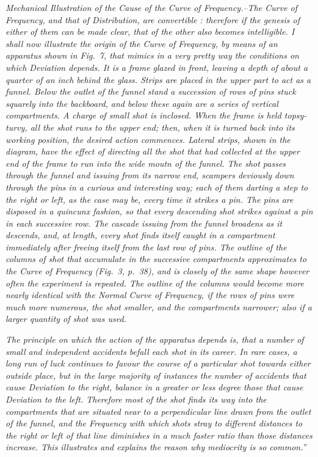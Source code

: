 {\it {\em Mechanical Illustration of the Cause of the Curve of Frequency}.--The Curve of Frequency, and that of Distribution, are convertible : therefore if the genesis of either of them can be made clear, that of the other also becomes intelligible.  I shall now illustrate the origin of the Curve of Frequency, by means of an apparatus shown in Fig.~7, that mimics in a very pretty way the conditions
on which Deviation depends.  It is a frame glazed in front, leaving a depth of about a quarter of an inch behind the glass.  Strips are placed in the upper part to act as a funnel.  Below the outlet of the funnel stand a succession of rows of pins stuck squarely into the backboard, and below these again are a series of vertical compartments.  A charge of small shot is inclosed.  When the frame is held topsy-turvy, all the shot runs to the upper end; then, when it is turned back into its working position, the desired action commences.  Lateral strips, shown in the diagram, have the effect of directing all the shot that had collected at the upper end of the frame to run into the wide moutn of the funnel.  The shot passes through the funnel and issuing from its narrow end, scampers deviously down through the pins in a curious and interesting way; each of them darting a step to the right or left, as the case may be, every time it strikes a pin.  The pins are disposed in a quincunx fashion, so that every descending shot strikes against a pin in each successive row.  The cascade issuing from the funnel broadens as it descends, and, at length, every shot finds itself caught in a compartment immediately after freeing itself from the last row of pins.  The outline of the columns of shot that accumulate in the successive compartments approximates to the Curve of Frequency (Fig.~3, p.~38), and is closely of the same shape however often the experiment is repeated.  The outline of the columns would become more nearly identical with the Normal Curve of Frequency, if the rows of pins were much more numerous, the shot smaller, and the compartments narrower; also if a larger quantity of shot was used.}

{\it The principle on which the action of the apparatus depends is, that a number of small and independent accidents befall each shot in its career.  In rare cases, a long run of luck continues to favour the course of a particular shot towards either outside place, but in the large majority of instances the number of accidents that cause Deviation to the right, balance in a greater or less degree those that cause Deviation to the left.  Therefore most of the shot finds its way into the compartments that are situated near to a perpendicular line drawn from the outlet of the funnel, and the Frequency with which shots stray to different distances to the right or left of that line diminishes in a much faster ratio than those distances increase.  This illustrates and explains the reason why mediocrity is so common.'' }

